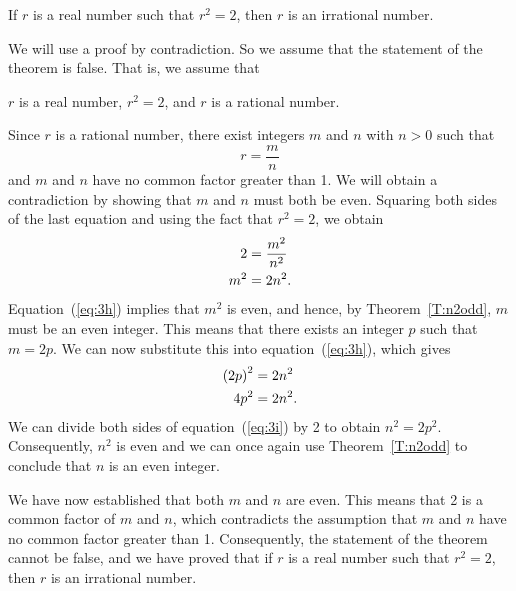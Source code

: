 

\setcounter{equation}{0}
\setcounter{theorem}{19}
\begin{theorem}
If  $r$  is a real number such that  $r^2  = 2$, then  $r$  is an irrational number.
\end{theorem}
\begin{myproof}
We will use a proof by contradiction.  So we assume that the statement of the theorem is false.  That is, we assume that
\begin{list}{}
  \item  $r$ is a real number,  $r^2  = 2$, and  $r$  is a rational number.
\end{list}
\noindent
Since  $r$  is a rational number, there exist integers  $m$  and  $n$  with  $n > 0$ such that  
\[
r = \frac{m}{n}
\]
and  $m$  and  $n$  have no common factor greater than 1.  We will obtain a contradiction by showing that  $m$  and  $n$  must both be even.  Squaring both sides of the last equation and using the fact that $r^2 = 2$, we obtain
\begin{align}
  2 &= \frac{{m^2 }}{{n^2 }} \notag \\ 
  m^2  &= 2n^2. 
  \label{eq:3h}%
\end{align} 
Equation~(\ref{eq:3h}) implies that $m^2$ is even, and hence, by Theorem~\ref{T:n2odd}, $m$ must be an even integer.  This means that there exists an integer $p$ such that $m = 2p$.  We can now substitute this into equation~(\ref{eq:3h}), which gives
\begin{align}
  \left( {2p} \right)^2  &= 2n^2 \notag \\ 
  4p^2  &= 2n^2. 
  \label{eq:3i}%
\end{align} 
We can divide both sides of equation~(\ref{eq:3i}) by 2 to obtain $n^2 = 2p^2$.  Consequently, $n^2$ is even and we can once again use Theorem~\ref{T:n2odd} to conclude that $n$ is an even integer.

We have now established that both  $m$  and  $n$  are even.  This means that  2  is a common factor of  $m$  and  $n$, which contradicts the assumption that $m$  and  $n$  have no common factor greater than 1.  Consequently, the statement of the theorem cannot be false, and we have proved that if  $r$  is a real number such that  $r^2  = 2$, then  $r$  is an irrational number.
\end{myproof}
\hbreak


\endinput


